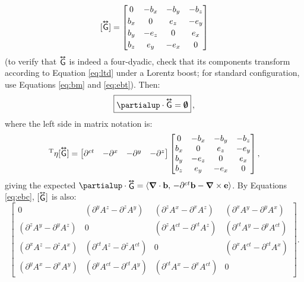 \documentclass[12pt]{article}
\renewcommand{\vv}[1]{\mathbf{#1}}
\newcommand{\del}{\boldsymbol{\nabla}}
\newcommand{\tightoverset}[2]{%
  \mathop{#2}\limits^{\vbox to -.5ex{\kern-0.75ex\hbox{$#1$}\vss}}}
\newcommand{\inlinedy}[1]{\tightoverset{\text{\tiny$\bm\leftrightarrow$}}{#1}}
\newcommand{\capdy}[1]{ \overset{ \text{\tiny$\bm\leftrightarrow$} }{\vphantom{\text{\small{A}}}\smash{#1}} }
\begin{document}
\begin{equation}\label{eq:mt}
[ \capdy{\mathsf{G}} ]
=
\begin{bmatrix}
0 & -b_x & -b_y & -b_z \\[.5ex]
b_x & 0 & e_z & -e_y \\[.5ex]
b_y & -e_z & 0 & e_x \\[.5ex]
b_z & e_y & -e_x & 0
\end{bmatrix}
\end{equation}
(to verify that $\inlinedy{\mathsf{G}}$ is indeed a four-dyadic, check that its components transform according to Equation \ref{eq:ltd} under a Lorentz boost; for standard configuration, use Equations \ref{eq:bm} and \ref{eq:ebt}). Then:
\begin{equation}\label{eq:hme}
\boxed{ \vphantom{A_{A_A}} \partialup \cdot \capdy{\mathsf{G}} = \textrm{\mbox{\boldmath $\emptyset$}} } \, ,
\end{equation}
where the left side in matrix notation is:
\begin{equation*}
[\partialup]^{\mathrm{T}} \eta [\capdy{\mathsf{G}}]
=
\begin{bmatrix}
\partial^{ct} & - \partial^x & - \partial^y & - \partial^z
\end{bmatrix}
\begin{bmatrix}
0 & -b_x & -b_y & -b_z \\
b_x & 0 & e_z & -e_y \\
b_y & -e_z & 0 & e_x \\
b_z & e_y & -e_x & 0
\end{bmatrix} ,
\end{equation*}
giving the expected $\partialup \cdot \inlinedy{\mathsf{G}} = \langle \del \cdot \vv b , \, - \partial^{ct} \vv b - \del \times \vv e \rangle$. By Equations \ref{eq:ebc}, $[\inlinedy{\mathsf{G}}]$ is also:
\begin{equation*}
\begin{bmatrix}
0 & ( \partial^y A^z - \partial^z A^y ) & ( \partial^z A^x - \partial^x A^z ) & ( \partial^x A^y - \partial^y A^x ) \\[1.5ex]
( \partial^z A^y - \partial^y A^z ) & 0 & ( \partial^z A^{ct} - \partial^{ct} A^z ) & ( \partial^{ct} A^y - \partial^y A^{ct} ) \\[1.5ex]
( \partial^x A^z - \partial^z A^x ) & ( \partial^{ct} A^z - \partial^z A^{ct} ) & 0 & ( \partial^x A^{ct} - \partial^{ct} A^x ) \\[1.5ex]
( \partial^y A^x - \partial^x A^y ) & ( \partial^y A^{ct} - \partial^{ct} A^y ) & ( \partial^{ct} A^x - \partial^x A^{ct} ) & 0
\end{bmatrix} .
\end{equation*}
\end{document}
